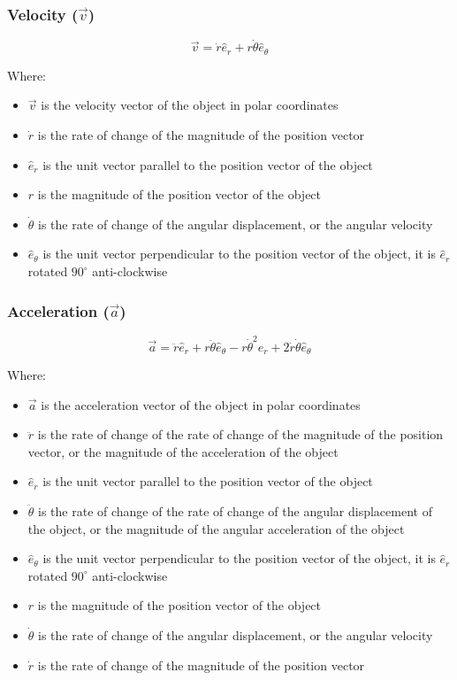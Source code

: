 \documentclass[11pt]{article}
\begin{document}
 \newpage

\subsubsection{Velocity (\(\vec{v}\))}
\label{sec:org27c8af0}
\[\vec{v} = \dot{r} \hat{e}_r + r \dot{\theta} \hat{e}_{\theta}\]

Where:
\begin{itemize}
\item \(\vec{v}\) is the velocity vector of the object in polar coordinates
\item \(\dot{r}\) is the rate of change of the magnitude of the position vector
\item \(\hat{e}_r\) is the unit vector parallel to the position vector of the object
\item \(r\) is the magnitude of the position vector of the object
\item \(\dot{\theta}\) is the rate of change of the angular displacement, or the angular velocity
\item \(\hat{e}_{\theta}\) is the unit vector perpendicular to the position vector of the object, it is \(\hat{e}_r\) rotated \(90^{\circ}\) anti-clockwise
\end{itemize}

\subsubsection{Acceleration (\(\vec{a}\))}
\label{sec:orgad9b352}
\label{org4f8ac63}
\[\vec{a} = \ddot{r} \hat{e}_r + r \ddot{\theta} \hat{e}_{\theta} - r \dot{\theta}^2 \hat{e}_r + 2 \dot{r} \dot{\theta} \hat{e}_{\theta}\]

Where:
\begin{itemize}
\item \(\vec{a}\) is the acceleration vector of the object in polar coordinates
\item \(\ddot{r}\) is the rate of change of the rate of change of the magnitude of the position vector, or the magnitude of the acceleration of the object
\item \(\hat{e}_r\) is the unit vector parallel to the position vector of the object
\item \(\ddot{\theta}\) is the rate of change of the rate of change of the angular displacement of the object, or the magnitude of the angular acceleration of the object
\item \(\hat{e}_{\theta}\) is the unit vector perpendicular to the position vector of the object, it is \(\hat{e}_r\) rotated \(90^{\circ}\) anti-clockwise
\item \(r\) is the magnitude of the position vector of the object
\item \(\dot{\theta}\) is the rate of change of the angular displacement, or the angular velocity
\item \(\dot{r}\) is the rate of change of the magnitude of the position vector
\end{itemize}
\end{document}
